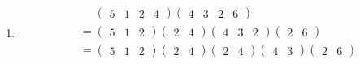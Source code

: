 \begin{example}[轮换的合并与截断]
\begin{enumerate}
	
	\item 
	\begin{equation}\begin{aligned}
	&\phantom{{}={}}\begin{pmatrix}
	5&1&2&4
	\end{pmatrix}
	\begin{pmatrix}
	4&3&2&6
	\end{pmatrix}\\
	&{}={}\begin{pmatrix}
	5&1&2
	\end{pmatrix}
	\begin{pmatrix}
	2&4
	\end{pmatrix}
	\begin{pmatrix}
	4&3&2
	\end{pmatrix}
	\begin{pmatrix}
	2&6
	\end{pmatrix}\\
	&{}={}\begin{pmatrix}
	5&1&2
	\end{pmatrix}
	\begin{pmatrix}
	2&4
	\end{pmatrix}
	\begin{pmatrix}
	2&4
	\end{pmatrix}
	\begin{pmatrix}
	4&3
	\end{pmatrix}
	\begin{pmatrix}
	2&6
	\end{pmatrix}\\

\end{aligned}
\end{equation}
\end{enumerate}
\end{example}
